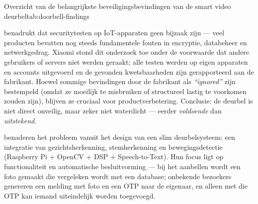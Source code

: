 \documentclass[nonacm, sigconf]{acmart}
\begin{document}
    \begin{SimpleTable}[s{0.5}s{1.5}]{Overzicht van de belangrijkste beveiligingsbevindingen van de smart video deurbel}{tab:doorbell-findings}
    \end{SimpleTable}


    \noindent
    \citeauthor{liu2021ethical} benadrukt dat securitytesten op IoT-apparaten geen bijzaak zijn — veel producten bevatten nog steeds fundamentele fouten in encryptie, databeheer en netwerkgedrag. Xiaomi stond dit onderzoek toe onder de voorwaarde dat andere gebruikers of servers niet werden geraakt; alle testen werden op eigen apparaten en accounts uitgevoerd en de gevonden kwetsbaarheden zijn gerapporteerd aan de fabrikant. Hoewel sommige bevindingen door de fabrikant als \textit{``ignored''} zijn bestempeld (omdat ze moeilijk te misbruiken of structureel lastig te voorkomen zouden zijn), blijven ze cruciaal voor productverbetering. Conclusie: de deurbel is niet direct onveilig, maar zeker niet waterdicht — eerder \emph{voldoende} dan \emph{uitstekend}.

    \bigskip


    \parencite{chaudhari2020smart} benaderen het probleem vanuit het design van een slim deurbelsysteem: een integratie van gezichtsherkenning, stemherkenning en bewegingsdetectie (Raspberry Pi + OpenCV + DSP + Speech-to-Text). Hun focus ligt op functionaliteit en automatische besluitvorming — bij het aanbellen wordt een foto gemaakt die vergeleken wordt met een database; onbekende bezoekers genereren een melding met foto en een OTP naar de eigenaar, en alleen met die OTP kan iemand uiteindelijk worden toegevoegd.
\end{document}
